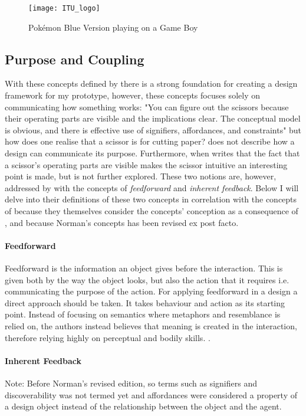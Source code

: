 \begin{figure}
  \texttt{[image: ITU\_logo]}
  \caption{Pokémon Blue Version playing on a Game Boy}
  \label{pokemon}
\end{figure}

\subsection{Purpose and Coupling}
With these concepts defined by  there is a strong foundation for creating a design framework for my prototype, however, these concepts focuses solely on communicating how something works: "You can figure out the scissors because their operating parts are visible and the implications clear. The conceptual model is obvious, and there is effective use of signifiers, affordances, and constraints" \cite[p. 27]{norman} but how does one realise that a scissor is for cutting paper?  does not describe how a design can communicate its purpose. Furthermore, when  writes that the fact that a scissor's operating parts are visible makes the scissor intuitive an interesting point is made, but is not further explored. These two notions are, however, addressed by  with the concepts of \textit{feedforward} and \textit{inherent feedback}. Below I will delve into their definitions of these two concepts in correlation with the concepts of  because they themselves consider the concepts' conception as a consequence of , and because Norman's concepts has been revised \cite{norman} ex post facto.

\paragraph{Feedforward} Feedforward is the information an object gives before the interaction. This is given both by the way the object looks, but also the action that it requires i.e. communicating the purpose of the action. For applying feedforward in a design a direct approach should be taken. It takes behaviour and action as its starting point. Instead of focusing on semantics where metaphors and resemblance is relied on, the authors instead believes that meaning is created in the interaction, therefore relying highly on perceptual and bodily skills. \cite{howdonald}.

\paragraph{Inherent Feedback} Note: Before Norman's revised edition, so terms such as signifiers and discoverability was not termed yet and affordances were considered a property of a design object instead of the relationship between the object and the agent.

